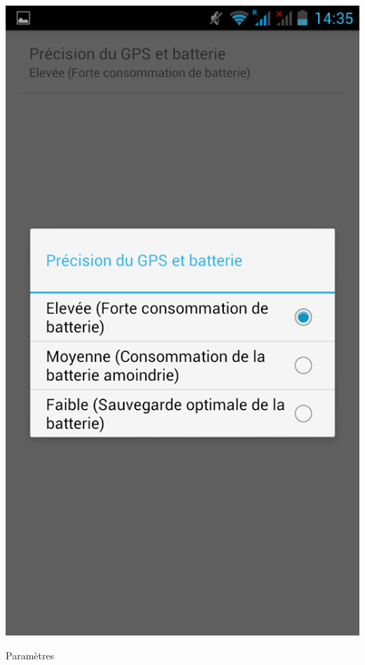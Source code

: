 \begin{appendices}
\begin{multicols}{3}
\begin{img}
  \includegraphics[scale=0.28]{img/parametres.jpg}
  \caption{Paramètres}
\end{img}
\end{multicols}

\end{appendices}


